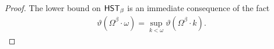 \documentclass[UKenglish,cleveref,DIV=12]{scrartcl}
\theoremstyle{definition}
\theoremstyle{definition}
\begin{document}
\begin{proof}
The lower bound on $\mathsf{HST}_\beta$ is an immediate consequence of the fact
\begin{align*}
  \vartheta(\Omega^{\beta}\cdot \omega)=\sup_{k<\omega}\vartheta(\Omega^{\beta}\cdot k).
\end{align*}
%
%
%
\end{proof}
\end{document}

